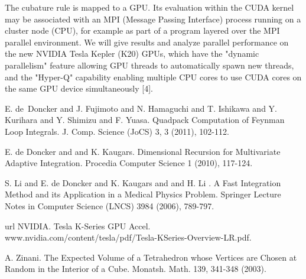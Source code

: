 \documentclass[article, A4, 11pt]{llncs}%
\begin{document}
The cubature rule is mapped to a GPU. Its evaluation within the CUDA kernel may be associated with an MPI (Message Passing Interface) process running on a cluster node (CPU), for example as part of a program layered over the MPI parallel environment. We will give results and analyze parallel performance on the new NVIDIA Tesla Kepler (K20) GPUs, which have the "dynamic parallelism" feature allowing GPU threads to automatically spawn new threads, and the "Hyper-Q" capability enabling multiple CPU cores to use CUDA cores on the same GPU device simultaneously [4].



\begin{thebibliography}{10}
{\sc E. de~Doncker and J. Fujimoto and N. Hamaguchi and T. Ishikawa and Y. Kurihara and Y. Shimizu and F. Yuasa}. {Quadpack Computation of Feynman Loop Integrals}. J. Comp. Science (JoCS) 3, 3 (2011), 102-112.

{\sc E. de Doncker and and K. Kaugars}. {Dimensional Recursion for Multivariate Adaptive Integration}. Procedia Computer Science 1 (2010), 117-124.

{\sc S. Li and E. de Doncker and K. Kaugars and and H. Li }. {A Fast Integration Method and its Application in a Medical Physics Problem}. Springer Lecture Notes in Computer Science (LNCS) 3984 (2006), 789-797.

{\sc url NVIDIA}. {Tesla K-Series GPU Accel}. www.nvidia.com/content/tesla/pdf/Tesla-KSeries-Overview-LR.pdf.

{\sc A. Zinani}. {The Expected Volume of a Tetrahedron whose Vertices are Chosen at Random in the Interior of a Cube}. Monatsh. Math. 139, 341-348 (2003).
\end{thebibliography} %
\end{document}
